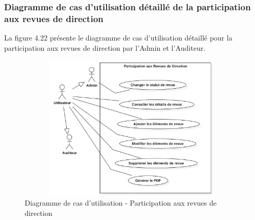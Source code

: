 \subsubsection{Diagramme de cas d'utilisation détaillé de la participation aux revues de direction}
\noindent La figure 4.22 présente le diagramme de cas d'utilisation détaillé pour la participation aux revues de direction par l'Admin et l'Auditeur.

\begin{figure}[H]
    \centering
    \includegraphics[width=11cm,height=7cm]{images/participationrevueuc.png}
    \caption{Diagramme de cas d'utilisation - Participation aux revues de direction}
\end{figure}

